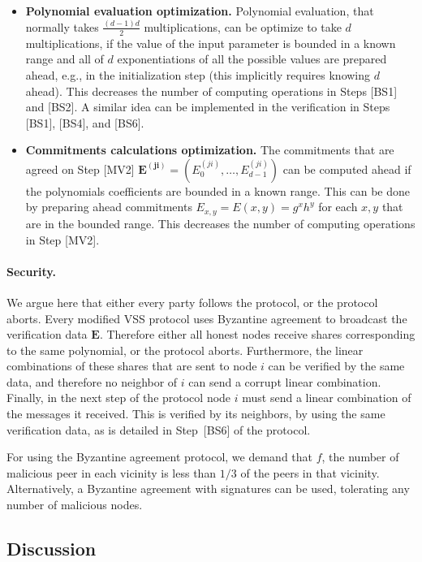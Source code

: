\documentclass[10pt]{svjour3}
\begin{document}
\begin{itemize}
\item \textbf{Polynomial evaluation optimization.} Polynomial
evaluation, that normally takes $\frac{(d-1)d}{2}$
multiplications, can be optimize to take $d$ multiplications, if
the value of the input parameter is bounded in a known range and
all of $d$ exponentiations of all the possible values are prepared
ahead, e.g., in the initialization step (this implicitly requires
knowing $d$ ahead). This decreases the number of computing
operations in Steps [BS1]
and [BS2]. A similar idea can be implemented in the verification
in Steps [BS1],
[BS4], and [BS6].


\item \textbf{Commitments calculations optimization.} The
commitments that are agreed on Step [MV2] $\mathbf{E^{(ji)}}=
(E_0^{(ji)},\ldots,E_{d-1}^{(ji)})$ can be computed ahead if the
polynomials coefficients are bounded in a known range. This can be
done by preparing ahead commitments $E_{x,y} = E(x,y) = g^xh^y$
for each $x,y$ that are in the bounded range. This decreases the
number of computing operations in Step [MV2].

\end{itemize}

\paragraph{Security.} We argue here that either every party follows
the protocol, or the protocol aborts. Every modified VSS protocol uses
Byzantine agreement to broadcast the verification data
$\mathbf{E}$. Therefore either all honest nodes receive shares
corresponding to the same polynomial, or the protocol
aborts. Furthermore, the linear combinations of these shares that are
sent to node $i$ can be verified by the same data, and therefore no
neighbor of $i$ can send a corrupt linear combination.
Finally, in the next step of the protocol node $i$ must send a linear
combination of the messages it received. This is verified by its
neighbors, by using the same verification data, as is detailed in
Step~[BS6] of the protocol.

For using the Byzantine agreement protocol, we demand that $f$, the
number of malicious peer in each vicinity is less than $1/3$ of the peers
in that vicinity. Alternatively, a Byzantine agreement with signatures
can be used, tolerating any number of malicious nodes.




\subsection{Discussion}
\label{insensitive}
\end{document}
